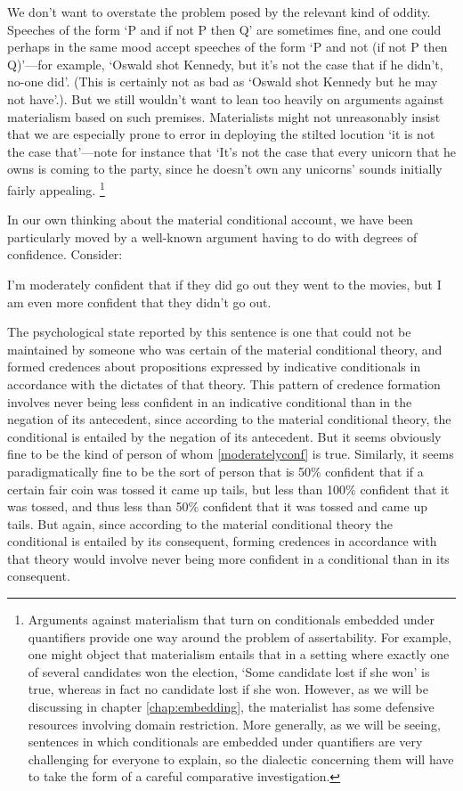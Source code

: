 \documentclass[If.tex]{subfiles}
\begin{document}
We don't want to overstate the problem posed by the relevant kind of oddity.  Speeches of the form ‘P and if not P then Q’ are sometimes fine, and one could perhaps in the same mood accept speeches of the form ‘P and not (if not P then Q)’---for example, ‘Oswald shot Kennedy, but it's not the case that if he didn't, no-one did’.  (This is certainly not as bad as ‘Oswald shot Kennedy but he may not have’.).  But we still wouldn't want to lean too heavily on arguments against materialism based on such premises.  Materialists might not unreasonably insist that we are especially prone to error in deploying the stilted locution ‘it is not the case that’---note for instance that ‘It's not the case that every unicorn that he owns is coming to the party, since he doesn't own any unicorns’ sounds initially fairly appealing.%
\footnote{Arguments against materialism that turn on conditionals embedded under quantifiers provide one way around the problem of assertability.  For example, one might object that materialism entails that in a setting where exactly one of several candidates won the election, ‘Some candidate lost if she won’ is true, whereas in fact no candidate lost if she won.  However, as we will be discussing in chapter \autoref{chap:embedding}, the materialist has some defensive resources involving domain restriction.  More generally, as we will be seeing, sentences in which conditionals are embedded under quantifiers are very challenging for everyone to explain, so the dialectic concerning them will have to take the form of a careful comparative investigation.}  

In our own thinking about the material conditional account, we have been particularly moved by a well-known argument having to do with degrees of confidence.  Consider:
\begin{prop}
	\nitem \label{moderatelyconf}
	I'm moderately confident that if they did go out they went to the movies, but I am even more confident that they didn't go out.  
\end{prop}
The psychological state reported by this sentence is one that could not be maintained by someone who was certain of the material conditional theory, and formed credences about propositions expressed by indicative conditionals in accordance with the dictates of that theory.  This pattern of credence formation involves never being less confident in an indicative conditional than in the negation of its antecedent, since according to the material conditional theory, the conditional is entailed by the negation of its antecedent.  But it seems obviously fine to be the kind of person of whom \ref{moderatelyconf} is true.  Similarly, it seems paradigmatically fine to be the sort of person that is 50\% confident that if a certain fair coin was tossed it came up tails, but less than 100\% confident that it was tossed, and thus less than 50\% confident that it was tossed and came up tails.  But again, since according to the material conditional theory the conditional is entailed by its consequent, forming credences in accordance with that theory would involve never being more confident in a conditional than in its consequent.  
\end{document}

